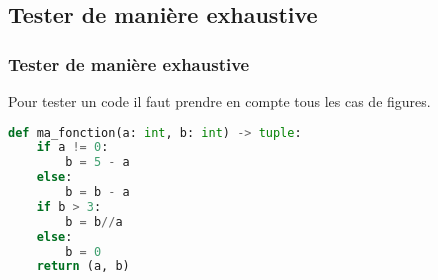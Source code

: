 \documentclass[svgnames,11pt]{beamer}
\begin{document}
\subsection{Tester de manière exhaustive}
\begin{frame}[fragile]
    \frametitle{Tester de manière exhaustive}

    \begin{aretenir}[]
        Pour tester un code il faut prendre en compte tous les cas de figures.
    \end{aretenir}
\begin{center}
\begin{lstlisting}[language=Python , basicstyle=\ttfamily\small, xleftmargin=2em, xrightmargin=2em]
def ma_fonction(a: int, b: int) -> tuple:
    if a != 0:
        b = 5 - a
    else:
        b = b - a
    if b > 3:
        b = b//a
    else:
        b = 0
    return (a, b)
\end{lstlisting}
\end{center}

\end{frame}
\end{document}
